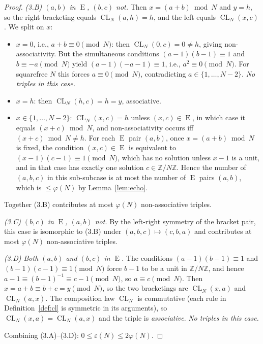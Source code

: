 \documentclass[11pt,reqno]{amsart}
\theoremstyle{plain}
\theoremstyle{definition}
\theoremstyle{remark}
\DeclareMathOperator{\CL}{CL}
\DeclareMathOperator{\ECHO}{E}
\newcommand{\ZN}{\mathbb{Z}/N\mathbb{Z}}
\begin{document}
\begin{proof}
\smallskip\noindent\textit{(3.B) $(a,b)$ in $\ECHO$, $(b,c)$ not.}
Then $x=(a+b)\bmod N$ and $y=h$, so the right bracketing equals
$\CL_N(a,h)=h$, and the left equals $\CL_N(x,c)$. We split on $x$:
\begin{itemize}\setlength\itemsep{0pt}
\item $x=0$, i.e., $a+b\equiv 0\pmod N$: then $\CL_N(0,c)=0\neq h$,
giving non-associativity. But the simultaneous conditions
$(a-1)(b-1)\equiv 1$ and $b\equiv -a\pmod N$ yield
$(a-1)(-a-1)\equiv 1$, i.e., $a^{2}\equiv 0\pmod N$. For squarefree
$N$ this forces $a\equiv 0\pmod N$, contradicting
$a\in\{1,\dots,N-2\}$. \emph{No triples in this case.}
\item $x=h$: then $\CL_N(h,c)=h=y$, associative.
\item $x\in\{1,\dots,N-2\}$: $\CL_N(x,c)=h$ unless $(x,c)\in\ECHO$,
in which case it equals $(x+c)\bmod N$, and non-associativity
occurs iff $(x+c)\bmod N\neq h$. For each $\ECHO$ pair $(a,b)$,
once $x=(a+b)\bmod N$ is fixed, the condition $(x,c)\in\ECHO$ is
equivalent to $(x-1)(c-1)\equiv 1\pmod N$, which has no solution
unless $x-1$ is a unit, and in that case has exactly one solution
$c\in\ZN$. Hence the number of $(a,b,c)$ in this sub-subcase is at
most the number of $\ECHO$ pairs $(a,b)$, which is $\le\varphi(N)$
by Lemma~\ref{lem:echo}.
\end{itemize}
Together (3.B) contributes at most $\varphi(N)$ non-associative
triples.

\smallskip\noindent\textit{(3.C) $(b,c)$ in $\ECHO$, $(a,b)$ not.}
By the left-right symmetry of the bracket pair, this case is
isomorphic to (3.B) under $(a,b,c)\mapsto(c,b,a)$ and contributes
at most $\varphi(N)$ non-associative triples.

\smallskip\noindent\textit{(3.D) Both $(a,b)$ and $(b,c)$ in $\ECHO$.}
The conditions $(a-1)(b-1)\equiv 1$ and $(b-1)(c-1)\equiv 1\pmod N$
force $b-1$ to be a unit in $\ZN$, and hence
$a-1\equiv(b-1)^{-1}\equiv c-1\pmod N$, so $a\equiv c\pmod N$. Then
$x=a+b\equiv b+c=y\pmod N$, so the two bracketings are
$\CL_N(x,a)$ and $\CL_N(a,x)$. The composition law $\CL_N$ is
commutative (each rule in Definition~\ref{def:cl} is symmetric in
its arguments), so $\CL_N(x,a)=\CL_N(a,x)$ and the triple is
\emph{associative}. \emph{No triples in this case.}

\smallskip\noindent
Combining (3.A)--(3.D): $0\le\varepsilon(N)\le 2\varphi(N)$.


\end{proof}
\end{document}
